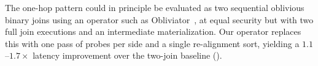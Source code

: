 
The one-hop pattern could in principle be evaluated as two sequential 
oblivious binary joins using an operator such as 
Obliviator~\cite{mavrogiannakis2025obliviator}, at equal security but with 
two full join executions and an intermediate materialization. Our operator 
replaces this with one pass of probes per side and a single re-alignment 
sort, yielding a $1.1$--$1.7\times$ latency improvement over the two-join 
baseline ().

